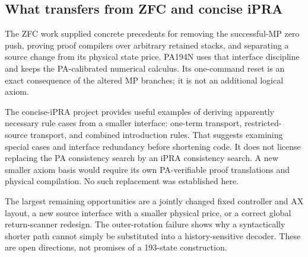 \subsection{What transfers from ZFC and concise iPRA}

The ZFC work supplied concrete precedents for removing the successful-MP
zero push, proving proof compilers over arbitrary retained stacks, and
separating a source change from its physical state price. PA194N uses that
interface discipline and keeps the PA-calibrated numerical calculus.
Its one-command reset is an exact consequence of the altered MP branches;
it is not an additional logical axiom.

The concise-iPRA project provides useful examples of deriving apparently
necessary rule cases from a smaller interface: one-term transport,
restricted-source transport, and combined introduction rules. That suggests
examining special cases and interface redundancy before shortening code.
It does not license replacing the PA consistency search by an iPRA
consistency search. A new smaller axiom basis would require its own
PA-verifiable proof translations and physical compilation. No such
replacement was established here.

The largest remaining opportunities are a jointly changed fixed controller
and AX layout, a new source interface with a smaller physical price, or a
correct global return-scanner redesign. The outer-rotation failure shows
why a syntactically shorter path cannot simply be substituted into a
history-sensitive decoder. These are open directions, not promises of a
193-state construction.
